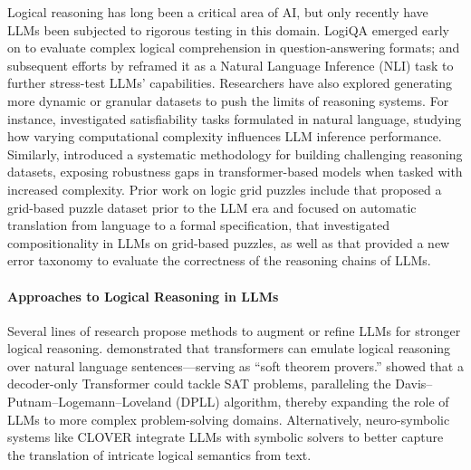 Logical reasoning has long been a critical area of AI, but only recently have LLMs been subjected to rigorous testing in this domain. LogiQA \cite{Liu2020LogiQAAC} emerged early on to evaluate complex logical comprehension in question-answering formats; and subsequent efforts by \cite{Liu2023LogiQA2I} reframed it as a Natural Language Inference (NLI) task to further stress-test LLMs’ capabilities. Researchers have also explored generating more dynamic or granular datasets to push the limits of reasoning systems. For instance, \citet{madusanka-etal-2024-natural} investigated satisfiability tasks formulated in natural language, studying how varying computational complexity influences LLM inference performance. Similarly, \citet{Richardson2021PushingTL} introduced a systematic methodology for building challenging reasoning datasets, exposing robustness gaps in transformer-based models when tasked with increased complexity. Prior work on logic grid puzzles include \citet{Mitra2015LearningTA} that proposed a grid-based puzzle dataset prior to the LLM era and focused on automatic translation from language to a formal specification, \citet{Dziri2023FaithAF} that investigated compositionality in LLMs on grid-based puzzles, as well as \citet{Tyagi2024StepbyStepRT} that provided a new error taxonomy to evaluate the correctness of the reasoning chains of LLMs.

\paragraph{Approaches to Logical Reasoning in LLMs}

Several lines of research propose methods to augment or refine LLMs for stronger logical reasoning. \citet{Clark2020TransformersAS} demonstrated that transformers can emulate logical reasoning over natural language sentences—serving as ``soft theorem provers.'' \citet{Pan2024CanTR} showed that a decoder-only Transformer could tackle SAT problems, paralleling the Davis–Putnam–Logemann–Loveland (DPLL) algorithm, thereby expanding the role of LLMs to more complex problem-solving domains. Alternatively, neuro-symbolic systems like CLOVER \cite{Ryu2024DivideAT} integrate LLMs with symbolic solvers to better capture the translation of intricate logical semantics from text.


